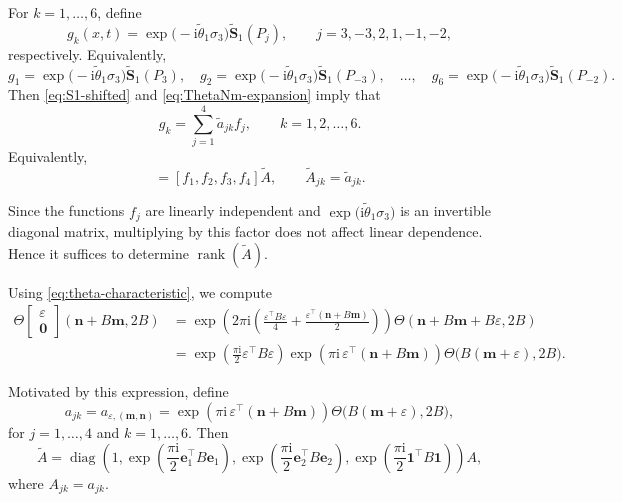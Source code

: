 \documentclass{amsart}
\numberwithin{equation}{hw}
\begin{document}
For \(k=1,\ldots,6\), define
\begin{equation}
g_k(x,t)
=
\exp\!\bigl(-\mathrm{i}\widetilde{\theta}_1\sigma_3\bigr)\widetilde{\bm{S}}_1(P_j),
\qquad
j=3,-3,2,1,-1,-2,
\label{eq:gk-definition}
\end{equation}
respectively. Equivalently,
\[
g_1=\exp\!\bigl(-\mathrm{i}\widetilde{\theta}_1\sigma_3\bigr)\widetilde{\bm{S}}_1(P_3),
\quad
g_2=\exp\!\bigl(-\mathrm{i}\widetilde{\theta}_1\sigma_3\bigr)\widetilde{\bm{S}}_1(P_{-3}),
\quad
\dots,
\quad
g_6=\exp\!\bigl(-\mathrm{i}\widetilde{\theta}_1\sigma_3\bigr)\widetilde{\bm{S}}_1(P_{-2}).
\]
Then \eqref{eq:S1-shifted} and \eqref{eq:ThetaNm-expansion} imply that
\begin{equation}
g_k
=
\sum_{j=1}^{4}
\widetilde{a}_{jk}f_j,
\qquad
k=1,2,\ldots,6.
\label{eq:gk-expansion}
\end{equation}
Equivalently,
\begin{equation}
[g_1,g_2,\ldots,g_6]
=
[f_1,f_2,f_3,f_4]\widetilde{A},
\qquad
\widetilde{A}_{jk}
=
\widetilde{a}_{jk}.
\label{eq:matrix-factorization}
\end{equation}

Since the functions \(f_j\) are linearly independent and \(\exp\!\bigl(\mathrm{i}\widetilde{\theta}_1\sigma_3\bigr)\) is an invertible diagonal matrix, multiplying by this factor does not affect linear dependence. Hence it suffices to determine \(\operatorname{rank}(\widetilde{A})\).

Using \eqref{eq:theta-characteristic}, we compute
\begin{align}
\Theta\!\begin{bmatrix}
\varepsilon\\
\bm{0}
\end{bmatrix}
(\bm{n}+B\bm{m},2B)
&=
\exp\!\left(
2\pi\mathrm{i}
\left(
\frac{\varepsilon^{\top}B\varepsilon}{4}
+
\frac{\varepsilon^{\top}(\bm{n}+B\bm{m})}{2}
\right)
\right)
\Theta(\bm{n}+B\bm{m}+B\varepsilon,2B)
\nonumber\\[4pt]
&=
\exp\!\left(
\frac{\pi\mathrm{i}}{2}
\varepsilon^{\top}B\varepsilon
\right)
\exp\!\left(
\pi\mathrm{i}\,
\varepsilon^{\top}(\bm{n}+B\bm{m})
\right)
\Theta\bigl(B(\bm{m}+\varepsilon),2B\bigr).
\label{eq:theta-shift-expansion}
\end{align}

Motivated by this expression, define
\begin{equation}
a_{jk}
=
a_{\varepsilon,(\bm{m},\bm{n})}
=
\exp\!\left(
\pi\mathrm{i}\,
\varepsilon^{\top}(\bm{n}+B\bm{m})
\right)
\Theta\bigl(B(\bm{m}+\varepsilon),2B\bigr),
\label{eq:a-jk}
\end{equation}
for \(j=1,\ldots,4\) and \(k=1,\ldots,6\). Then
\begin{equation}
\widetilde{A}
=
\operatorname{diag}
\left(
1,
\exp\!\left(
\frac{\pi\mathrm{i}}{2}\bm{e}_1^{\top}B\bm{e}_1
\right),
\exp\!\left(
\frac{\pi\mathrm{i}}{2}\bm{e}_2^{\top}B\bm{e}_2
\right),
\exp\!\left(
\frac{\pi\mathrm{i}}{2}\bm{1}^{\top}B\bm{1}
\right)
\right)
A,
\label{eq:Atilde-A}
\end{equation}
where \(A_{jk}=a_{jk}\).
\end{document}
